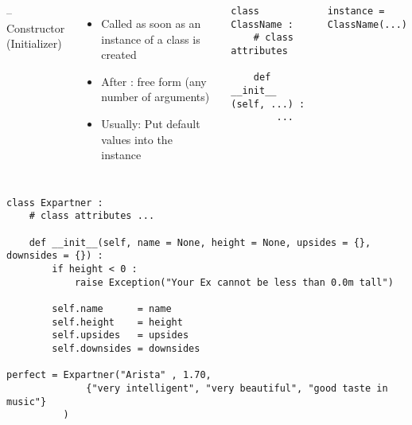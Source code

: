 
\begin{frame}[fragile]
%
\begin{columns}[T]
\begin{Large}
	{ -- Constructor (Initializer)}
\end{Large}
\vspace{6pt}
%
\begin{itemize}
\item Called as soon as an instance of a class is created
\item After : free form (any number of arguments)
\item Usually: Put default values into the instance
\end{itemize}
%
\begin{codebox}
\begin{verbatim}
class ClassName :
    # class attributes
    
    def __init__ (self, ...) :
        ...
\end{verbatim}
\end{codebox}
%
\begin{codebox}
\begin{verbatim}
instance = ClassName(...)
\end{verbatim}
\end{codebox}
\end{columns}
%
\end{frame}


\begin{frame}[fragile]
%
\begin{codebox}
\begin{verbatim}
class Expartner :
    # class attributes ...
    
    def __init__(self, name = None, height = None, upsides = {}, downsides = {}) :
        if height < 0 :
            raise Exception("Your Ex cannot be less than 0.0m tall")
        
        self.name      = name
        self.height    = height
        self.upsides   = upsides
        self.downsides = downsides
    
perfect = Expartner("Arista" , 1.70, 
              {"very intelligent", "very beautiful", "good taste in music"}
          )
\end{verbatim}
\end{codebox}
%
\end{frame}

